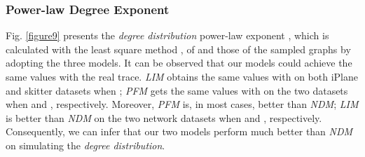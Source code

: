 \documentclass[a4paper]{llncs}
\begin{document}
\begin{figure*}[!t]
\centering
{}
\hspace{2em}
\vspace{-1.7em}
\caption{The {\it degree distribution} power-law exponent  of the sampled graphs by using the three models, compared with that of , on the two real datasets, respectively.}
\label{figure9}
\vspace{-0.5em}
\end{figure*}



\subsubsection{Power-law Degree Exponent}
Fig. \ref{figure9} presents the {\it degree distribution} power-law exponent , which is calculated with the
least square method \cite{LeastSquareMethod}, of  and those of
the sampled graphs by adopting the three models. It can be observed that our models
could achieve the same values with the real trace.
\textit{LIM} obtains the same values with  on both iPlane and skitter datasets when ; \textit{PFM} gets the same values with  on
the two datasets when  and
, respectively. Moreover, \textit{PFM} is, in most cases, better
than \textit{NDM}; \textit{LIM} is better than \textit{NDM} on the two network datasets when  and , respectively. Consequently, we can infer that our two models perform much better than \textit{NDM} on simulating the {\it degree distribution}.



\begin{figure*}[!t]
\centering
{}
\hspace{2em}
\vspace{-1.7em}
\caption{The {\it clustering coefficient} of the sampled graphs by using the three models, compared with that of , on two real datasets: iPlane and skitter, respectively.}
\label{figure10}
\vspace{-0.8em}
\end{figure*}
\end{document}
